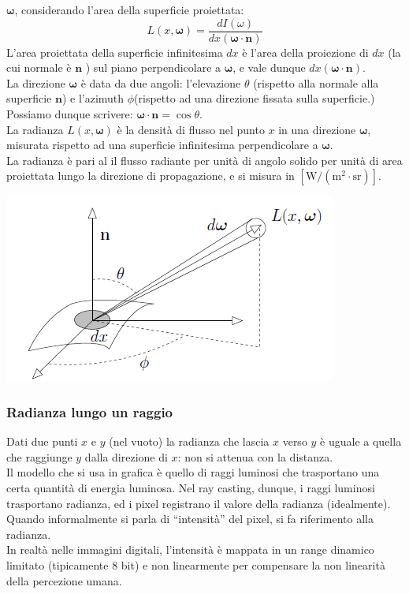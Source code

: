 \documentclass[a4paper, 10pt]{article}
\renewcommand{\vec}{\bm}
\begin{document}
\begin{itemize}
			$ \vec{\omega} $, considerando l’area della superficie proiettata:
			\[
				L(x,\vec{\omega}) = \dfrac{dI(\omega)}{dx(\vec{\omega}\cdot\vec{n})}
			\]
			L’area proiettata della superficie infinitesima $ dx $
			è l’area della proiezione di $ dx $ (la cui normale è $ \vec{n} $ ) sul
			piano perpendicolare a $ \vec{\omega} $, e vale dunque $ dx(\vec{\omega}\cdot\vec{n}) $.\\
			La direzione $ \vec{\omega} $ è data da due angoli: l’elevazione $ \theta $ (rispetto
			alla normale alla superficie $ \vec{n} $) e l’azimuth $ \phi $(rispetto ad una
			direzione fissata sulla superficie.)\\
			Possiamo dunque scrivere: $ \vec{\omega}\cdot\vec{n} = \cos\theta$.\\
			La radianza $ L(x,\vec{\omega}) $ è la densità di flusso nel punto $ x $ in una direzione $ \vec{\omega} $, misurata rispetto ad una superficie
			infinitesima perpendicolare a $ \vec{\omega} $.\\
			La radianza è pari al il flusso	radiante per unità di angolo
			solido per unità di area proiettata	lungo la direzione di propagazione, e si misura in 
			$ \left[ \si{\watt}/(\si{\meter}^2 \cdot \si{\steradian}) \right] $.
			
			\begin{center}
				\includegraphics[scale=0.4]{radianza}
			\end{center}
		\end{itemize}
		
		\subsubsection{Radianza lungo un raggio}
			Dati due punti $ x $ e $ y $ (nel vuoto) la radianza che lascia $ x $ verso
			$ y $ è uguale a quella che raggiunge $ y $ dalla direzione di $ x $: non si
			attenua con la distanza.\\
			Il modello che si usa in grafica è quello di raggi luminosi che
			trasportano una certa quantità di energia luminosa.
			Nel ray casting, dunque, i raggi luminosi trasportano radianza,
			ed i pixel registrano il valore della radianza (idealmente).\\
			Quando informalmente si parla di “intensità” del pixel, si fa
			riferimento alla radianza.\\
			In realtà nelle immagini digitali, l'intensità è mappata in un
			range dinamico limitato (tipicamente 8 bit) e non linearmente
			per compensare la non linearità della percezione umana.
			
\end{document}
